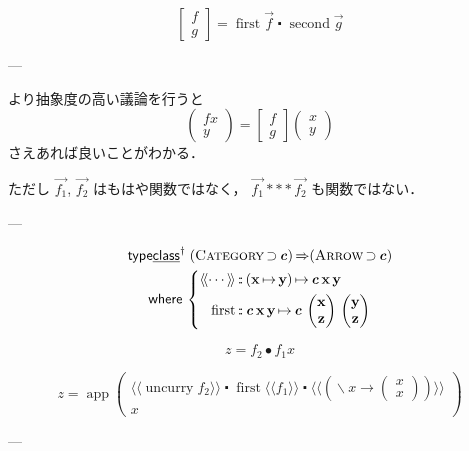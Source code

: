 \documentclass[a5paper,twoside,fleqn,draft]{jsbook}
\def\[{[\![}
\def\]{]\!]}
\newcommand{\Langle}{\langle\!\langle}
\newcommand{\Rangle}{\rangle\!\rangle}
\newcommand{\mKeyword}[1]{\mathsf{#1}}
\newcommand{\mKeywordUnderline}[1]{\text{\underline{\textsf{#1}}}}
\newcommand{\mTypeClassDeclKeyword}{\mKeyword{type}\mKeywordUnderline{class}}
\newcommand{\mWhereKeyword}{\mKeyword{where}}
\DeclareMathOperator{\mSuperClass}{\Rightarrow}
\DeclareMathOperator{\mSuperSet}{\supset}
\DeclareMathOperator{\mTypeClassDeclPolymorphic}{\mTypeClassDeclKeyword^\dagger}
\DeclareMathOperator{\mWhere}{\mWhereKeyword}
\newcommand{\mSpecialFunc}[1]{#1}
\DeclareMathOperator{\mFirst}{\mSpecialFunc{first}}
\DeclareMathOperator{\mSecond}{\mSpecialFunc{second}}
\DeclareMathOperator{\mUncurry}{\mSpecialFunc{uncurry}}
\DeclareMathOperator{\mComp}{\bullet}
\DeclareMathOperator{\mCompCat}{\centerdot}
\DeclareMathOperator{\mIn}{{:\!:}}
\DeclareMathOperator{\mLambda}{\backslash}
\DeclareMathOperator{\mLambdaArrow}{\rightarrow}
\DeclareMathOperator{\mMapsTo}{\mapsto}
\newcommand{\mType}[1]{\mathbf{#1}} %
\newcommand{\mPolymorphicTypeParameter}[1]{\textbf{\textit{#1}}}
\newcommand{\mX}{\mType{x}}
\newcommand{\mY}{\mType{y}}
\newcommand{\mZ}{\mType{z}}
\newcommand{\mTypeConstructor}[1]{\textsl{#1}}
\newcommand{\mValueConstructor}[1]{\mathrm{#1}}
\newcommand{\mValueWith}[2]{{}^\mValueConstructor{#1}\[#2\]}
\newcommand{\mArrowWith}[1]{\Langle#1\Rangle}
\newcommand{\mPairWith}[2]{\begin{pmatrix}#1\\#2\end{pmatrix}}
\newcommand{\mTypeClass}[1]{\textsc{#1}} %
\newcommand{\mArrowTypeClass}{\mTypeClass{Arrow}}
\newcommand{\mCategoryTypeClass}{\mTypeClass{Category}}
\begin{document}
\begin{equation}
  \begin{bmatrix}
    f\\g
  \end{bmatrix}
  =\mFirst\Vec{f}\mCompCat\mSecond\Vec{g}
\end{equation}

---

より抽象度の高い議論を行うと
\begin{equation}
  \mPairWith{fx}{y}
  =\begin{bmatrix}f\\g\end{bmatrix}
  \mPairWith{x}{y}
\end{equation}
さえあれば良いことがわかる．


ただし $\Vec{f_1}$, $\Vec{f_2}$ はもはや関数ではなく，
$\Vec{f_1}***\Vec{f_2}$ も関数ではない．

---

\newcommand{\mFirstFunc}{\mathop{\mathrm{first}}}

\begin{multline}
  \mTypeClassDeclPolymorphic\;
  (\mCategoryTypeClass\mSuperSet\mPolymorphicTypeParameter{c})
  \mSuperClass(\mArrowTypeClass\mSuperSet\mPolymorphicTypeParameter{c})\\
  \mWhere{}\left\{
  \begin{aligned}
    \mArrowWith{\dotsb}
    &\mIn{}(\mX\mMapsTo\mY)\mMapsTo\mPolymorphicTypeParameter{c}\,\mX\,\mY\\
    \mFirstFunc
    &\mIn{}\mPolymorphicTypeParameter{c}\,\mX\,\mY
    \mMapsTo\mPolymorphicTypeParameter{c}\,\mPairWith{\mX}{\mZ}\,\mPairWith{\mY}{\mZ}
  \end{aligned}
  \right.
\end{multline}

\begin{equation}
  z=f_2\mComp f_1x
\end{equation}

\begin{equation}
  z=\mathop{\mathrm{app}}\mPairWith{\mArrowWith{\mUncurry f_2}\mCompCat\mFirstFunc\mArrowWith{f_1}\mCompCat{}\mArrowWith{\left(\mLambda x\mLambdaArrow\mPairWith{x}{x}\right)}}{x}
\end{equation}

---


\newcommand{\mUncircuit}{\mathop{\mathrm{uncircuit}}}
\newcommand{\mCircuitType}{\mTypeConstructor{Circ}}
\newcommand{\mCircuitWith}[1]{\mValueWith{Circ}{#1}}
\end{document}

